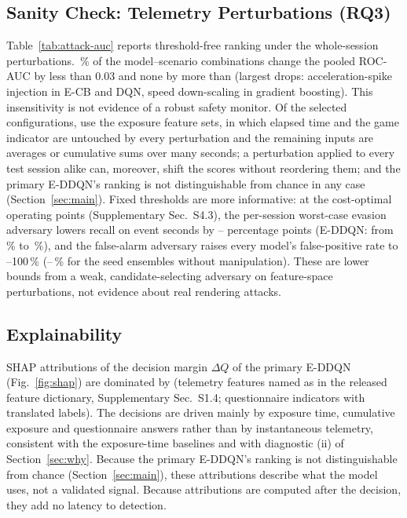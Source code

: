 \subsection{Sanity Check: Telemetry Perturbations (RQ3)}
\label{sec:attack}
Table~\ref{tab:attack-auc} reports threshold-free ranking under the whole-session perturbations. \AttAucFracSmall\,\% of the model--scenario combinations change the pooled ROC-AUC by less than 0.03 and none by more than \AttAucMaxAbsChange{} (largest drops: acceleration-spike injection in E-CB and DQN, speed down-scaling in gradient boosting). This insensitivity is not evidence of a robust safety monitor. Of the \PHFsTotal{} selected configurations, \PHFsExposure{} use the exposure feature sets, in which elapsed time and the game indicator are untouched by every perturbation and the remaining inputs are averages or cumulative sums over many seconds; a perturbation applied to every test session alike can, moreover, shift the scores without reordering them; and the primary E-DDQN's ranking is not distinguishable from chance in any case (Section~\ref{sec:main}). Fixed thresholds are more informative: at the cost-optimal operating points (Supplementary Sec.~S4.3), the per-session worst-case evasion adversary lowers recall on event seconds by \AttEvasionDropMin--\AttEvasionDropMax{} percentage points (E-DDQN: from \EDDQNAttCleanRecall\,\% to \EDDQNAttWorstRecall\,\%), and the false-alarm adversary raises every model's false-positive rate to \EDDQNAttWorstFPR--100\,\% (\RFAttCleanFPR--\CSMLPAttCleanFPR\,\% for the seed ensembles without manipulation). These are lower bounds from a weak, candidate-selecting adversary on feature-space perturbations, not evidence about real rendering attacks.

\begin{table}[t]
\centering
\caption{Threshold-free robustness: pooled outer-test ROC-AUC of the seed-ensemble score on clean telemetry and under whole-session perturbations (the last column gives the most negative and most positive change over all \AttAucNVariants{} whole-session variants, including the evasion-only candidates).}
\label{tab:attack-auc}
\footnotesize

\end{table}


\subsection{Explainability}
\label{sec:xai}
SHAP attributions of the decision margin $\Delta Q$ of the primary E-DDQN (Fig.~\ref{fig:shap}) are dominated by \ShapTopFive{} (telemetry features named as in the released feature dictionary, Supplementary Sec.~S1.4; questionnaire indicators with translated labels). The decisions are driven mainly by exposure time, cumulative exposure and questionnaire answers rather than by instantaneous telemetry, consistent with the exposure-time baselines and with diagnostic (ii) of Section~\ref{sec:why}. Because the primary E-DDQN's ranking is not distinguishable from chance (Section~\ref{sec:main}), these attributions describe what the model uses, not a validated signal. Because attributions are computed after the decision, they add no latency to detection.


